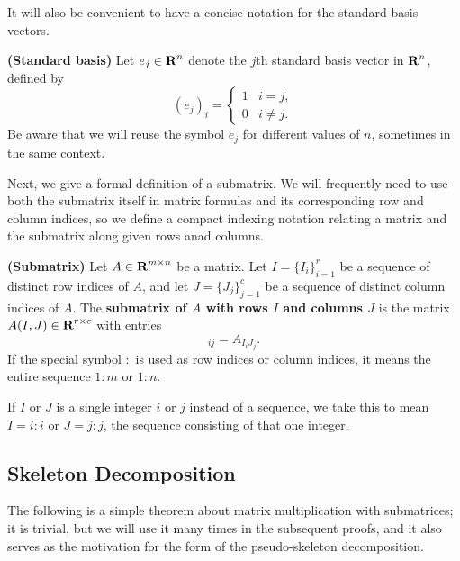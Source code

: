 \documentclass{article}
\begin{document}
	It will also be convenient to have a concise notation for the standard basis vectors.
	
	\begin{dfn} \textnormal{\bf(Standard basis)}
		\label{def:standard_basis}
		Let $e_j \in \textnormal{\bf R}^n$ denote the $j$th standard basis vector in $\textnormal{\bf R}^n$, defined by
		\begin{equation}
			(e_j)_i = \begin{cases}
				1 & i = j, \\
				0 & i \ne j.
			\end{cases}
		\end{equation}
		Be aware that we will reuse the symbol $e_j$ for different values of $n$, sometimes in the same context.
	\end{dfn}
	
	Next, we give a formal definition of a submatrix. We will frequently need to use both the submatrix itself in matrix formulas and its corresponding row and column indices, so we define a compact indexing notation relating a matrix and the submatrix along given rows anad columns.
	
	\begin{dfn} \textnormal{\bf(Submatrix)}
		\label{def:submatrix}
		Let $A \in \textnormal{\bf R}^{m\times n}$ be a matrix. Let $I = \{I_i\}_{i=1}^r$ be a sequence of distinct row indices of $A$, and let $J = \{J_j\}_{j=1}^c$ be a sequence of distinct column indices of $A$. The \textbf{submatrix of $A$ with rows $I$ and columns $J$} is the matrix $A(I,J) \in \textnormal{\bf R}^{r\times c}$ with entries
		\begin{equation}
			[A(I,J)]_{ij} = A_{I_iJ_j}.
		\end{equation}
		If the special symbol $:$ is used as row indices or column indices, it means the entire sequence $1:m$ or $1:n$.
		
		If $I$ or $J$ is a single integer $i$ or $j$ instead of a sequence, we take this to mean $I = i:i$ or $J = j:j$, the sequence consisting of that one integer.
	\end{dfn}
	
	\subsection{Skeleton Decomposition}
	
	The following is a simple theorem about matrix multiplication with submatrices; it is trivial, but we will use it many times in the subsequent proofs, and it also serves as the motivation for the form of the pseudo-skeleton decomposition.
	
\end{document}
